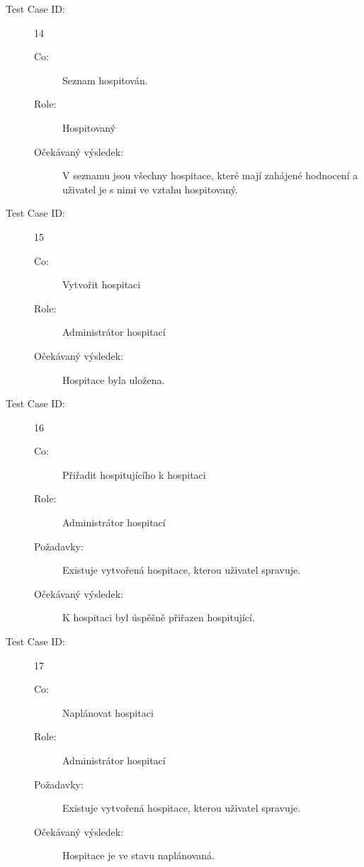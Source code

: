 \begin{description}
\item[Test Case ID:] 14
\begin{description}
\item[Co:] Seznam hospitován.
\item[Role:] Hospitovaný
\item[Očekávaný výsledek:] V seznamu jsou všechny hospitace, které mají zahájené hodnocení a uživatel je s nimi ve vztahu hospitovaný.
\end{description}
\end{description}

\begin{description}
\item[Test Case ID:] 15
\begin{description}
\item[Co:] Vytvořit hospitaci
\item[Role:] Administrátor hospitací
\item[Očekávaný výsledek:] Hospitace byla uložena.
\end{description}
\end{description}

\begin{description}
\item[Test Case ID:] 16
\begin{description}
\item[Co:] Přiřadit hospitujícího k hospitaci
\item[Role:] Administrátor hospitací
\item[Požadavky:] Existuje vytvořená hospitace, kterou uživatel spravuje.
\item[Očekávaný výsledek:] K hospitaci byl úspěšně přiřazen hospitující.
\end{description}
\end{description}

\begin{description}
\item[Test Case ID:] 17
\begin{description}
\item[Co:] Naplánovat hospitaci
\item[Role:] Administrátor hospitací
\item[Požadavky:] Existuje vytvořená hospitace, kterou uživatel spravuje.
\item[Očekávaný výsledek:] Hospitace je ve stavu naplánovaná.
\end{description}
\end{description}

